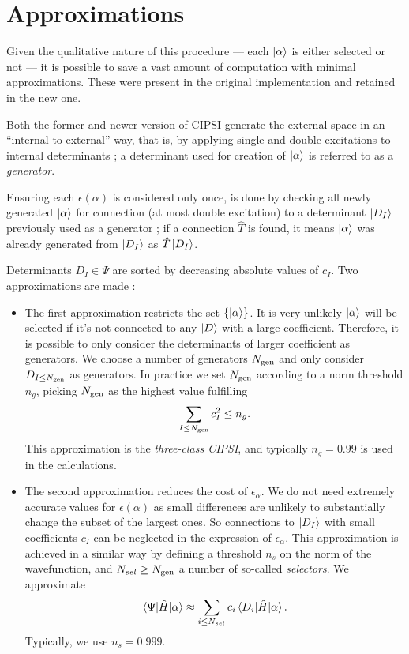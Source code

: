 \documentclass[./thesis.tex]{subfiles}
\begin{document}
\section{Approximations}

Given the qualitative nature of this procedure --- each ${\ket{\alpha}}$ is either selected or not --- it is possible to save a vast amount of computation with minimal approximations. These were present in the original implementation and retained in the new one.

Both the former and newer version of CIPSI generate the external space in an ``internal to external'' way, that is, by applying single and double excitations to internal determinants ; a determinant used for creation of ${\ket{\alpha}}$ is referred to as a \emph{generator}.

Ensuring each $\epsilon(\alpha)$ is considered only once, is done by checking all newly generated ${\ket{\alpha}}$ for connection (at most double excitation) to a determinant $\ket {D_I}$ previously used as a generator ; if a connection $\hat T$ is found, it means ${\ket{\alpha}}$ was already generated from $\ket {D_I}$ as $\hat T \ket {D_I}$.

Determinants $D_I \in \Psi$ are sorted by decreasing absolute values of $c_I$. Two approximations are made :

\begin{itemize}
\item
The first approximation restricts the set $\{{\ket{\alpha}}\}$. It is very unlikely $\ket \alpha$ will be selected if it's not connected to any $\ket D$ with a large coefficient. Therefore, it is possible to only consider the determinants of larger coefficient as generators. We choose a number of generators ${N_\text{gen}}$ and only consider $D_{I \leq {N_\text{gen}}}$ as generators. In practice we set ${N_\text{gen}}$ according to a norm threshold $n_g$, picking ${N_\text{gen}}$ as the highest value fulfilling
\begin{equation}
\sum_{I \leq {N_\text{gen}}} c_I^2 \leq n_g.
\end{equation}
This approximation is the \emph{three-class CIPSI},\cite{Evangelisti_1983}
and typically $n_g=0.99$ is used in the calculations.
\item The second approximation reduces the cost of $\epsilon_\alpha$.
We do not need extremely accurate values for $\epsilon(\alpha)$ as small differences are unlikely to substantially change the subset of the largest ones.
So  connections to $\ket {D_I}$ with small coefficients $c_I$ can be neglected
in the expression of $\epsilon_\alpha$.
This approximation is achieved in a similar way by defining a threshold $n_s$
on the norm of the wavefunction, and $N_{sel} \geq {N_\text{gen}}$ a number of so-called
\emph{selectors}. We approximate 
\begin{equation}
  \mel{\Psi}{\hat{H}}{\alpha} \approx \sum_{i \leq N_{sel}} c_i \mel{D_i}{\hat{H}}{\alpha}.
\end{equation}
Typically, we use $n_s = 0.999$.

\end{itemize}
\end{document}
